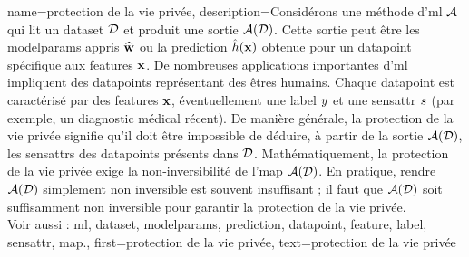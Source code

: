 {name={protection de la vie privée},
	description={Considérons une méthode d’\gls{ml} $\mathcal{A}$ qui lit un \gls{dataset} $\mathcal{D}$ et produit une sortie $\mathcal{A}(\mathcal{D})$. Cette sortie peut être les \glspl{modelparam} appris $\widehat{{\bf w}}$ ou la \gls{prediction} $\hat{h}({\bf x})$ obtenue pour un \gls{datapoint} spécifique aux \glspl{feature} ${\bf x}$. 
		De nombreuses applications importantes d'\gls{ml} impliquent des \glspl{datapoint} représentant des êtres humains. Chaque \gls{datapoint} est caractérisé par des \glspl{feature} ${\bf x}$, éventuellement une \gls{label} $y$ et une \gls{sensattr} $s$ (par exemple, un diagnostic médical récent). 
		De manière générale, la protection de la vie privée signifie qu’il doit être impossible de déduire, à partir de la sortie $\mathcal{A}(\mathcal{D})$, les \glspl{sensattr} des \glspl{datapoint} présents dans $\mathcal{D}$. 
		Mathématiquement, la protection de la vie privée exige la non-inversibilité de l'\gls{map} $\mathcal{A}(\mathcal{D})$. En pratique, rendre $\mathcal{A}(\mathcal{D})$ simplement non inversible est souvent insuffisant ; il faut que $\mathcal{A}(\mathcal{D})$ soit suffisamment non inversible pour garantir la protection de la vie privée.
		\\
		Voir aussi : \gls{ml}, \gls{dataset}, \glspl{modelparam}, \gls{prediction}, \gls{datapoint}, \gls{feature}, \gls{label}, \gls{sensattr}, \gls{map}.},
	first={protection de la vie privée},
	text={protection de la vie privée}
}


